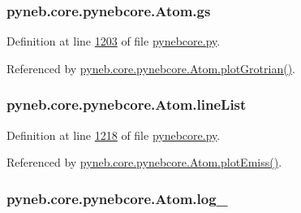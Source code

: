 \hypertarget{classpyneb_1_1core_1_1pynebcore_1_1_atom_a3e6bcb66f905475145b261ae797096e3}{}
\subsubsection[{gs}]{\setlength{\rightskip}{0pt plus 5cm}pyneb.\+core.\+pynebcore.\+Atom.\+gs}\label{classpyneb_1_1core_1_1pynebcore_1_1_atom_a3e6bcb66f905475145b261ae797096e3}


Definition at line \hyperlink{pynebcore_8py_source_l01203}{1203} of file \hyperlink{pynebcore_8py_source}{pynebcore.\+py}.



Referenced by \hyperlink{pynebcore_8py_source_l02372}{pyneb.\+core.\+pynebcore.\+Atom.\+plot\+Grotrian()}.

\hypertarget{classpyneb_1_1core_1_1pynebcore_1_1_atom_a8280ef5632977a7cf7e8fe4c63127703}{}
\subsubsection[{line\+List}]{\setlength{\rightskip}{0pt plus 5cm}pyneb.\+core.\+pynebcore.\+Atom.\+line\+List}\label{classpyneb_1_1core_1_1pynebcore_1_1_atom_a8280ef5632977a7cf7e8fe4c63127703}


Definition at line \hyperlink{pynebcore_8py_source_l01218}{1218} of file \hyperlink{pynebcore_8py_source}{pynebcore.\+py}.



Referenced by \hyperlink{pynebcore_8py_source_l02313}{pyneb.\+core.\+pynebcore.\+Atom.\+plot\+Emiss()}.

\hypertarget{classpyneb_1_1core_1_1pynebcore_1_1_atom_a9e2e5b5402bb9cf14c1b08684bccbf6b}{}
\subsubsection[{log\+\_\+}]{\setlength{\rightskip}{0pt plus 5cm}pyneb.\+core.\+pynebcore.\+Atom.\+log\+\_\+}\label{classpyneb_1_1core_1_1pynebcore_1_1_atom_a9e2e5b5402bb9cf14c1b08684bccbf6b}



